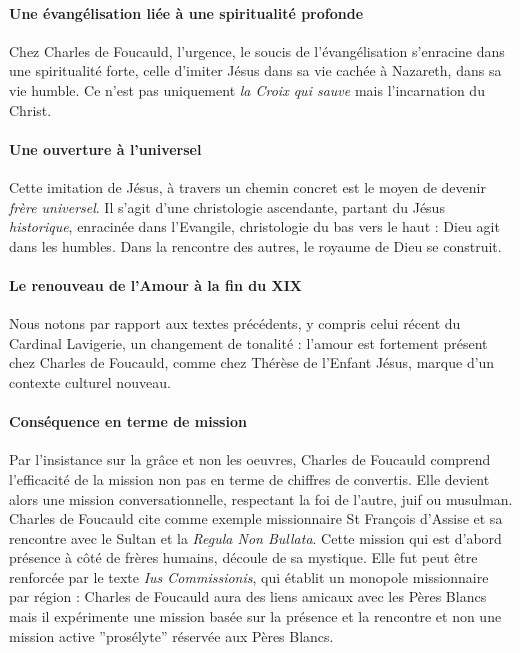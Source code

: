 \paragraph{Une évangélisation liée à une spiritualité profonde} Chez Charles de Foucauld, l'urgence, le soucis de l'évangélisation s'enracine dans une spiritualité forte, celle d'imiter Jésus dans sa vie cachée à Nazareth, dans sa vie humble.  Ce n'est pas uniquement\textit{ la Croix qui sauve} mais l'incarnation du Christ.

\paragraph{Une ouverture à l'universel} Cette imitation de Jésus, à travers un chemin concret est le moyen de devenir \textit{frère universel}. Il s'agit d'une christologie ascendante, partant du Jésus \textit{historique}, enracinée dans l'Evangile, christologie du bas vers le haut : Dieu agit dans les humbles. Dans la rencontre des autres,  le royaume de Dieu se construit.  

\paragraph{Le renouveau de l'Amour à la fin du XIX} Nous notons par rapport aux textes précédents, y compris celui récent du Cardinal Lavigerie, un changement de tonalité : l'amour est fortement présent chez Charles de Foucauld, comme chez Thérèse de l'Enfant Jésus, marque d'un contexte culturel nouveau.

\paragraph{Conséquence en terme de mission} Par l'insistance sur la grâce et non les oeuvres, Charles de Foucauld comprend l'efficacité de la mission non pas en terme de chiffres de convertis. Elle devient alors une mission conversationnelle, respectant la foi de l'autre, juif ou musulman. Charles de Foucauld cite comme exemple missionnaire St François d'Assise et sa rencontre avec le Sultan et la \textit{Regula Non Bullata}. Cette mission qui est d'abord présence à côté de frères humains,  découle de sa mystique. Elle fut peut être renforcée par le texte \textit{Ius Commissionis}, qui établit un monopole missionnaire par région : Charles de Foucauld aura des liens amicaux avec les Pères Blancs mais il expérimente une mission basée sur la présence et la rencontre et non une mission active ”prosélyte” réservée aux Pères Blancs.

